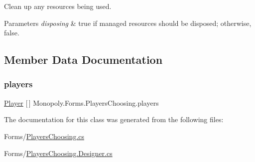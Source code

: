 Clean up any resources being used. 


\begin{DoxyParams}{Parameters}
{\em disposing} & true if managed resources should be disposed; otherwise, false.\\
\hline
\end{DoxyParams}


\subsection{Member Data Documentation}
\mbox{\label{class_monopoly_1_1_forms_1_1_players_choosing_a5f63db54ee80fbdf21885eff762dbb6e}} 
\subsubsection{\texorpdfstring{players}{players}}
{\footnotesize\ttfamily \mbox{\hyperlink{class_monopoly_1_1_players_1_1_player}{Player}} \mbox{[}$\,$\mbox{]} Monopoly.\+Forms.\+Players\+Choosing.\+players}



The documentation for this class was generated from the following files\+:\begin{DoxyCompactItemize}
\item 
Forms/\mbox{\hyperlink{_players_choosing_8cs}{Players\+Choosing.\+cs}}\item 
Forms/\mbox{\hyperlink{_players_choosing_8_designer_8cs}{Players\+Choosing.\+Designer.\+cs}}\end{DoxyCompactItemize}

